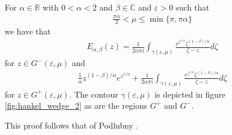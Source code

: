 \begin{mdframed}[innertopmargin=10pt]
\begin{lemma}
    \label{lem:mit_lef_contour_1}
    For $ \alpha \in \mathbb{R} $ with $ 0 < \alpha < 2 $ and $ \beta \in \mathbb{C} $ and $ \varepsilon > 0 $
    such that
    \begin{align}
        \label{eq:mit_lef_region}
	    \frac{\pi \alpha}{2} < \mu \leq \min\{ \pi, \pi \alpha \}
    \end{align}
    we have that
    \begin{align}
	    \label{eq:mit_lef_contour_1}
        E_{\alpha, \beta}(z) = \frac{1}{2\alpha\pi i} \int_{\gamma(\varepsilon, \mu)} \frac{e^{\zeta^{1 / \alpha}}\zeta^{(1-\beta)/\alpha}}{\zeta - z} d\zeta
    \end{align}
    for $ z \in G^{-}(\varepsilon, \mu) $
    and
    \begin{align}
    \label{eq:mit_lef_contour_2}
	\frac{1}{\alpha} z^{(1-\beta) / \alpha} e^{z^{1 / \alpha}} + \frac{1}{2\alpha\pi i} \int_{\gamma(\varepsilon, \mu)} \frac{e^{\zeta^{1 / \alpha}}\zeta^{(1-\beta)/\alpha}}{\zeta - z} d\zeta
    \end{align}
    for $ z \in G^{+}(\varepsilon, \mu) $.
    The contour $ \gamma(\varepsilon, \mu) $ is depicted in figure \ref{fig:hankel_wedge_2} as are the regions $ G^+ $ and $ G^-$.
\end{lemma}
\end{mdframed}
This proof follows that of Podlubny \cite{Podlubny1999}.
